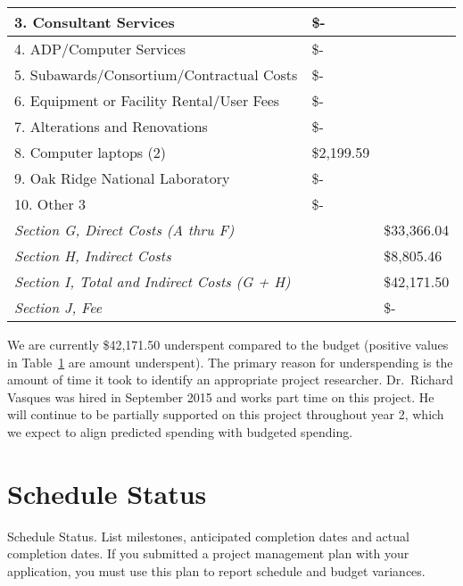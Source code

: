 \documentclass[12pt]{article}
\begin{document}
\begin{table}[h!]
\begin{center}
\begin{tabular}{ | l | l | l | }
	\hspace*{1 em}3.  Consultant Services &  \$-    & \  \\ \hline
	\hspace*{1 em}4.  ADP/Computer Services &  \$-    & \  \\ \hline
	\hspace*{1 em}5.  Subawards/Consortium/Contractual Costs &  \$-    & \  \\ \hline
	\hspace*{1 em}6.  Equipment or Facility Rental/User Fees &  \$-    & \  \\ \hline
	\hspace*{1 em}7.  Alterations and Renovations &  \$-    & \  \\ \hline
	\hspace*{1 em}8.  Computer laptops (2) & \$2,199.59 & \  \\ \hline
	\hspace*{1 em}9. Oak Ridge National Laboratory &  \$-    & \  \\ \hline
	\hspace*{1 em}10. Other 3 &  \$-    & \  \\ \hline
	\textit{Section G, Direct Costs (A thru F)} &  & \$33,366.04 \\ \hline
	\textit{Section H, Indirect Costs} &  & \$8,805.46 \\ \hline
	\textit{Section I, Total and Indirect Costs (G + H)} &  & \$42,171.50 \\ \hline
	\textit{Section J, Fee }&  &  \$-    \\ \hline
\end{tabular}
\label{tab:differences}
\end{center}
\end{table}

We are currently \$42,171.50 underspent compared to the budget (positive values in Table~\ref{tab:differences} are amount underspent). 
The primary reason for underspending is the amount of time it took to identify an appropriate project researcher. 
Dr.\ Richard Vasques was hired in September 2015 and works part time on this project.
He will continue to be partially supported on this project throughout year 2, which we expect to align predicted spending with budgeted spending. 


\section{Schedule Status}
\label{sect::schedule}
Schedule Status.  List milestones, anticipated completion dates and actual completion dates.  If you submitted a project management plan with your application, you must use this plan to report schedule and budget variances.   
\end{document}
